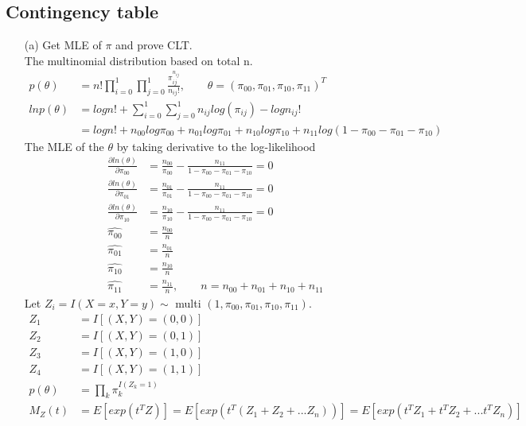 \subsection{Contingency table}
\begin{itemize}
	\item [(a)] Get MLE of $\pi$ and prove CLT.\\
	The multinomial distribution based on total n. 
	\begin{align*}
		p(\theta) &=n! \prod_{i=0}^1 \prod_{j=0}^1  \frac{\pi_{ij}^{n_{ij}}}{n_{ij}!}, \qquad \theta = (\pi_{00}, \pi_{01}, \pi_{10}, \pi_{11})^T\\
		ln p(\theta) &=log n!+ \sum_{i=0}^1 \sum_{j=0}^1 n_{ij}log( \pi_{ij}) - log n_{ij}! \\
		&= log n!+ n_{00}log \pi_{00}  + n_{01}log \pi_{01}  + n_{10}log \pi_{10}  + n_{11}log (1-\pi_{00}-\pi_{01} - \pi_{10})  
	\end{align*}
	The MLE of the $\theta$ by taking derivative to the log-likelihood
	\begin{align*}
		\frac{\partial ln(\theta)}{\partial \pi_{00}} &= \frac{n_{00}}{\pi_{00}} - \frac{n_{11}}{1-\pi_{00}-\pi_{01}-\pi_{10}} = 0\\  
		\frac{\partial ln(\theta)}{\partial \pi_{01}} &=\frac{n_{01}}{\pi_{01}} - \frac{n_{11}}{1-\pi_{00}-\pi_{01}-\pi_{10}} = 0 \\  
		\frac{\partial ln(\theta)}{\partial \pi_{10}} &= \frac{n_{10}}{\pi_{10}} - \frac{n_{11}}{1-\pi_{00}-\pi_{01}-\pi_{10}} = 0\\ 
		\hat{\pi_{00}} & = \frac{n_{00}}{n}\\
		\hat{\pi_{01}} & = \frac{n_{01}}{n}\\
		\hat{\pi_{10}} & = \frac{n_{10}}{n}\\
		\hat{\pi_{11}} & = \frac{n_{11}}{n}, \qquad n= n_{00} + n_{01} + n_{10} + n_{11}
	\end{align*}
	Let $Z_i= I(X=x, Y=y) \sim $ multi $(1, \pi_{00}, \pi_{01}, \pi_{10}, \pi_{11})$.
	\begin{align*}
		Z_1 &= I[(X,Y)= (0,0)]\\
		Z_2 &= I[(X,Y)= (0,1)]\\
		Z_3 &= I[(X,Y)= (1,0)]\\
		Z_4 &= I[(X,Y)= (1,1)]\\
		p(\theta) &= \prod_k \pi_{k}^{I(Z_k=1)}\\
		M_Z(t) &= E[exp(t^TZ)] = E[exp(t^T(Z_1 + Z_2 +... Z_n))] = E[exp(t^TZ_1 + t^TZ_2 + ... t^TZ_n)]\\

\end{align*}
\end{itemize}

